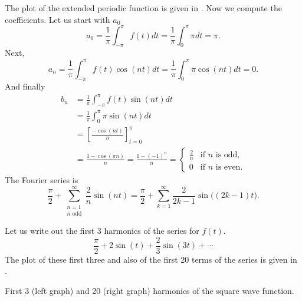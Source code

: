 \documentclass{ximera}
\begin{document}
\begin{exampleSol}
    The plot of the extended periodic function is given in . Now we compute the coefficients.  Let us start with $a_0$
    \begin{equation*}
        a_0 = \frac{1}{\pi} \int_{-\pi}^\pi f(t) dt = \frac{1}{\pi} \int_{0}^\pi \pi dt = \pi .
    \end{equation*}
    Next,
    \begin{equation*}
        a_n = \frac{1}{\pi} \int_{-\pi}^\pi f(t) \cos (nt) dt = \frac{1}{\pi} \int_{0}^\pi \pi \cos (nt) dt = 0 .
    \end{equation*}
    And finally
    \begin{equation*}
        \begin{split}
            b_n & = \frac{1}{\pi} \int_{-\pi}^\pi f(t) \sin (nt) dt \\
            & = \frac{1}{\pi} \int_{0}^\pi \pi \sin (nt) dt \\
            & = \left[ \frac{- \cos (nt)}{n} \right]_{t=0}^\pi \\
            & = \frac{1 - \cos (\pi n)}{n} = \frac{1 - {(-1)}^n}{n} =
            \begin{cases}
                \frac{2}{n} & \text{if } n \text{ is odd} , \\
                0 & \text{if } n \text{ is even} .
            \end{cases}
        \end{split}
    \end{equation*}
    The Fourier series is
    \begin{equation*}
        \frac{\pi}{2} +  \sum_{\substack{n=1\\n \text{ odd}}}^\infty \frac{2}{n} \sin (n t) = \frac{\pi}{2} + \sum_{k=1}^\infty \frac{2}{2k-1} \sin \bigl( (2k-1) t \bigr) .
    \end{equation*}
    
    Let us write out the first 3 harmonics of the series for $f(t)$.
    \begin{equation*}
        \frac{\pi}{2} + 2  \sin (t) + \frac{2}{3}  \sin (3t) + \cdots
    \end{equation*}
    The plot of these first three and also of the first 20 terms of the series is given in .
    
    \begin{myfig}
        \capstart
        \caption{First 3 (left graph) and 20 (right graph) harmonics of the square wave function.\label{ts:squarewavefsfig}}
    \end{myfig}
\end{exampleSol}
\end{document}
